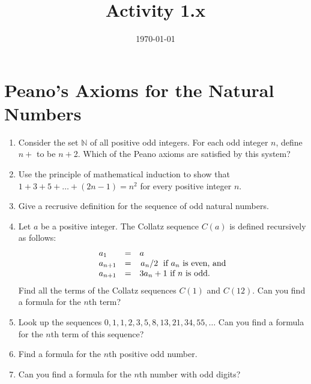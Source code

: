 \documentclass[12pt]{amsart}
\title{Activity 1.x}
\date{\today}
\begin{document}
\maketitle
\part*{Peano's Axioms for the Natural Numbers}
\begin{enumerate}
\item Consider the set $\mathbb{N}$ of all positive odd integers. For each odd integer $n$, define $n+$ to be $n+$2. Which of the Peano axioms are satisfied by this system?
\item Use the principle of mathematical induction to show that $1 + 3 + 5 + \ldots + (2n-1) = n^2$ for every positive integer $n$.
\item Give a recrusive definition for the sequence of odd natural numbers.
\item Let $a$ be a positive integer. The Collatz sequence $C(a)$ is defined recursively as follows:
\begin{equation*}
  \begin{array}{lcl}
    a_1 &=& a \\
    a_{n+1}&=&\flatfrac{a_n}{2} \text { if } a_n \text{ is even, and}\\
    a_{n+1}&=&3a_n+1 \text{ if } n \text{ is odd.}
  \end{array}
\end{equation*}
Find all the terms of the Collatz sequences $C(1)$ and $C(12)$. Can you find a formula for the $n$th term?
\item Look up the sequences $0, 1, 1, 2, 3, 5, 8, 13, 21, 34, 55,\ldots$ Can you find a formula for the $n$th term of this sequence?
\item Find a formula for the $n$th positive odd number.
\item Can you find a formula for the $n$th number with odd digits?
\end{enumerate}
\end{document}
